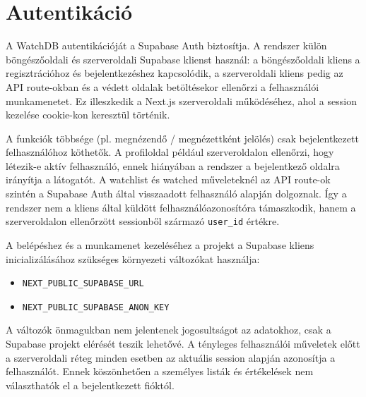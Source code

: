 \section{Autentikáció}

A WatchDB autentikációját a Supabase Auth biztosítja. A rendszer külön böngészőoldali és szerveroldali Supabase klienst használ: a böngészőoldali kliens a regisztrációhoz és bejelentkezéshez kapcsolódik, a szerveroldali kliens pedig az API route-okban és a védett oldalak betöltésekor ellenőrzi a felhasználói munkamenetet. Ez illeszkedik a Next.js szerveroldali működéséhez, ahol a session kezelése cookie-kon keresztül történik.

A funkciók többsége (pl. megnézendő / megnézettként jelölés) csak bejelentkezett felhasználóhoz köthetők. A profiloldal például szerveroldalon ellenőrzi, hogy létezik-e aktív felhasználó, ennek hiányában a rendszer a bejelentkező oldalra irányítja a látogatót. A watchlist és watched műveleteknél az API route-ok szintén a Supabase Auth által visszaadott felhasználó alapján dolgoznak. Így a rendszer nem a kliens által küldött felhasználóazonosítóra támaszkodik, hanem a szerveroldalon ellenőrzött sessionből származó \texttt{user\_id} értékre.

A belépéshez és a munkamenet kezeléséhez a projekt a Supabase kliens inicializálásához szükséges környezeti változókat használja:

\begin{itemize}
    \item \texttt{NEXT\_PUBLIC\_SUPABASE\_URL}
    \item \texttt{NEXT\_PUBLIC\_SUPABASE\_ANON\_KEY}
\end{itemize}

A változók önmagukban nem jelentenek jogosultságot az adatokhoz, csak a Supabase projekt elérését teszik lehetővé. A tényleges felhasználói műveletek előtt a szerveroldali réteg minden esetben az aktuális session alapján azonosítja a felhasználót. Ennek köszönhetően a személyes listák és értékelések nem választhatók el a bejelentkezett fióktól.
